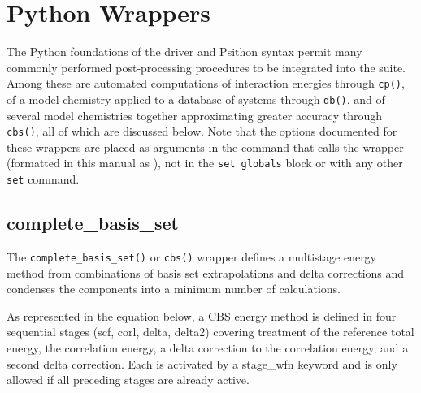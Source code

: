 \newcommand{\hiddensubsubsection}[1]{
\stepcounter{subsubsection}
\subsubsection*{\arabic{section}.\arabic{subsection}.\arabic{subsubsection}\hspace{1em}{#1}}}

\section{Python Wrappers\label{pywrappers}}

The Python foundations of the \PSIfour driver and Psithon syntax permit
many commonly performed post-processing procedures to be integrated into
the \PSIfour suite. 
Among these are automated computations of interaction energies through 
\texttt{cp()}, of a model chemistry applied to a database of systems through
\texttt{db()}, and of several model chemistries together approximating greater
accuracy through \texttt{cbs()}, all of which are discussed below.
Note that the options documented for these wrappers are placed as arguments
in the command that calls the wrapper (formatted in this manual as 
 ), 
not in the \texttt{set globals} block or with any other \texttt{set} command.

\subsection{complete\_basis\_set\label{wrapcbs}}

The \texttt{complete\_basis\_set()} or \texttt{cbs()} wrapper defines a
multistage energy method from combinations of basis set extrapolations 
and delta corrections and condenses the components into a minimum
number of calculations.

As represented in the equation below, a CBS energy method is defined in 
four sequential stages (scf, corl, delta, delta2) covering treatment of 
the reference total energy, the correlation energy, a delta 
correction to the correlation energy, and a second delta correction. 
Each is activated by a stage\_wfn keyword and is only allowed if all 
preceding stages are already active.

